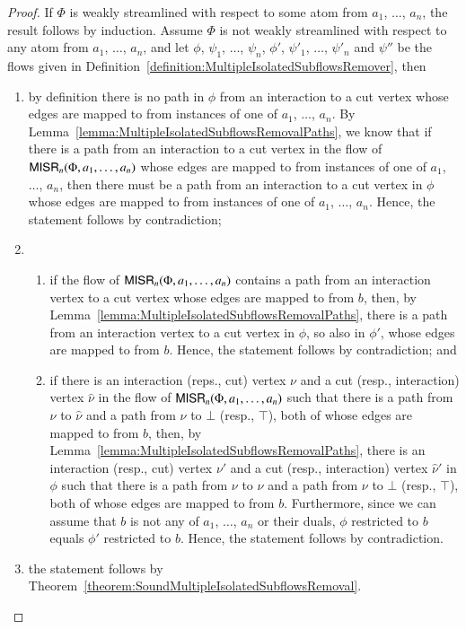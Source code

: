 \begin{proof}
If $\Phi$ is weakly streamlined with respect to some atom from $a_1$, $\dots$, $a_n$, the result follows by induction. Assume $\Phi$ is not weakly streamlined with respect to any atom from $a_1$, $\dots$, $a_n$, and let $\phi$, $\psi_1$, $\dots$, $\psi_n$, $\phi'$, $\psi'_1$, $\dots$, $\psi'_n$ and $\psi''$ be the flows given in Definition~\vref{definition:MultipleIsolatedSubflowsRemover}, then
\begin{enumerate}
\item by definition there is no path in $\phi$ from an interaction to a cut vertex whose edges are mapped to from instances of one of $a_1$, $\dots$, $a_n$. By Lemma~\vref{lemma:MultipleIsolatedSubflowsRemovalPaths}, we know that if there is a path from an interaction to a cut vertex in the flow of $\mathsf{MISR}_n(\Phi,a_1,\dots,a_n)$ whose edges are mapped to from instances of one of $a_1$, $\dots$, $a_n$, then there must be a path from an interaction to a cut vertex in $\phi$ whose edges are mapped to from instances of one of $a_1$, $\dots$, $a_n$. Hence, the statement follows by contradiction;
\item
\begin{enumerate}
 \item if the flow of $\mathsf{MISR}_n(\Phi,a_1,\dots,a_n)$ contains a path from an interaction vertex to a cut vertex whose edges are mapped to from $b$, then, by Lemma~\ref{lemma:MultipleIsolatedSubflowsRemovalPaths}, there is a path from an interaction vertex to a cut vertex in $\phi$, so also in $\phi'$, whose edges are mapped to from $b$. Hence, the statement follows by contradiction; and
 \item if there is an interaction (reps., cut) vertex $\nu$ and a cut (resp., interaction) vertex $\hat\nu$ in the flow of $\mathsf{MISR}_n(\Phi,a_1,\dots,a_n)$ such that there is a path from $\nu$ to $\hat\nu$ and a path from $\nu$ to $\bot$ (resp., $\top$), both of whose edges are mapped to from $b$, then, by Lemma~\ref{lemma:MultipleIsolatedSubflowsRemovalPaths}, there is an interaction (resp., cut) vertex $\nu'$ and a cut (resp., interaction) vertex $\hat\nu'$ in $\phi$ such that there is a path from $\nu$ to $\hat\nu$ and a path from $\nu$ to $\bot$ (resp., $\top$), both of whose edges are mapped to from $b$. Furthermore, since we can assume that $b$ is not any of $a_1$, $\dots$, $a_n$ or their duals, $\phi$ restricted to $b$ equals $\phi'$ restricted to $b$. Hence, the statement follows by contradiction.
\end{enumerate}
\item the statement follows by Theorem~\vref{theorem:SoundMultipleIsolatedSubflowsRemoval}.
\end{enumerate}
\end{proof}

